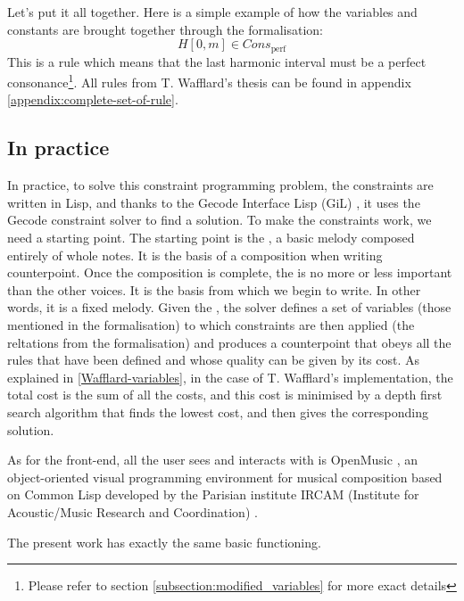 Let's put it all together. Here is a simple example of how the variables and constants are brought together through the formalisation: 
\begin{equation}    
    H[0, m] \in Cons_{\text{perf}}
\end{equation}
 This is a rule which means that the last harmonic interval must be a perfect consonance\footnote{Please refer to section \ref{subsection:modified_variables} for more exact details}. All rules from T. Wafflard's thesis can be found in appendix \ref{appendix:complete-set-of-rule}.



\subsection{In practice}
In practice, to solve this constraint programming problem, the constraints are written in Lisp, and thanks to the Gecode Interface Lisp (GiL) \cite{GiL}, it uses the Gecode constraint solver \cite{Gecode} to find a solution. To make the constraints work, we need a starting point. The starting point is the \cf, a basic melody composed entirely of whole notes. It is the basis of a composition when writing counterpoint. Once the composition is complete, the \cf is no more or less important than the other voices. It is the basis from which we begin to write. In other words, it is a fixed melody. 
Given the \cf, the solver defines a set of variables (those mentioned in the formalisation) to which constraints are then applied (the reltations from the formalisation) and produces a counterpoint that obeys all the rules that have been defined and whose quality can be given by its cost. As explained in \ref{Wafflard-variables}, in the case of T. Wafflard's implementation, the total cost is the sum of all the costs, and this cost is minimised by a depth first search algorithm that finds the lowest cost, and then gives the corresponding solution.


As for the front-end, all the user sees and interacts with is OpenMusic \cite{OpenMusic}, an object-oriented visual programming environment for musical composition based on Common Lisp \cite{commonlisp} developed by the Parisian institute IRCAM (Institute for Acoustic/Music Research and Coordination) \cite{IRCAM}.

The present work has exactly the same basic functioning. 


